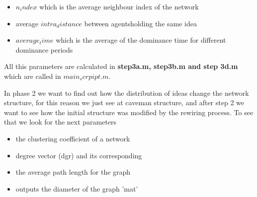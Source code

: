 \begin{itemize}
\item $n_index$ which is the average neighbour index of the network
\item average $intra_distance$ between agentsholding the same idea
\item $average_time$ which is the average of the dominance time for different dominance periods
\end{itemize}

All this parameters are calculated in \textbf{step3a.m, step3b.m and step 3d.m} which are called in $main_scrpipt.m.$

In phase 2 we want to find out how the distribution of ideas change the network structure, for this reason we just see at caveman structure, and after step 2 we want to see how the initial structure was modified by the rewiring process. To see that we look for the next parameters

\begin{itemize}
\item the clustering coefficient of a network
\item  degree vector (dgr) and its corresponding
\item the average path length for the graph
\item outputs the diameter of the graph 'mat'

\end{itemize}








      